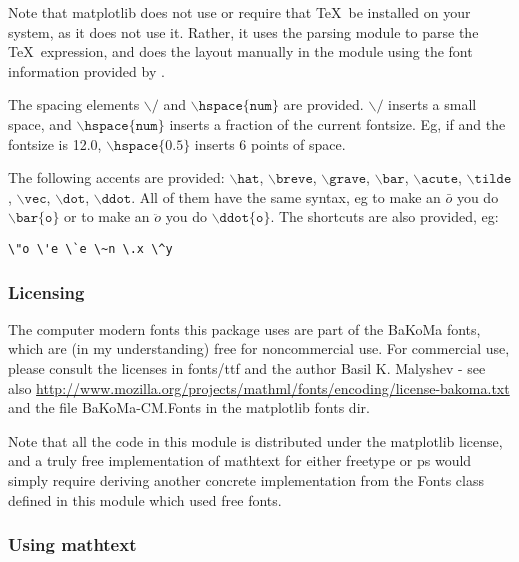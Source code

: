 \documentclass[twoside]{book}
\begin{document}
Note that matplotlib does not use or require that \TeX\ be installed on
your system, as it does not use it.  Rather, it uses the parsing
module  to parse the \TeX\ expression, and does the
layout manually in the  module using the
font information provided by .  

\noindent The spacing elements $\backslash/$ and $\mathtt{\backslash
  hspace\{num\}}$ are provided.  $\backslash /$ inserts a small space,
and $\mathtt{\backslash hspace\{num\}}$ inserts a fraction of the
current fontsize.  Eg, if  and the fontsize is 12.0,
$\mathtt{\backslash hspace\{0.5\}}$ inserts 6 points of space.

The following accents are provided: $\mathtt{\backslash hat}$,
$\mathtt{\backslash breve}$, $\mathtt{\backslash grave}$,
$\mathtt{\backslash bar}$, $\mathtt{\backslash acute}$,
$\mathtt{\backslash tilde}$, $\mathtt{\backslash vec}$,
$\mathtt{\backslash dot}$, $\mathtt{\backslash ddot}$.  All of them
have the same syntax, eg to make an $\bar{o}$ you do
$\mathtt{\backslash bar\{o\}}$ or to make an $\ddot{o}$ you do
$\mathtt{\backslash ddot\{o\}}$.  The shortcuts are also provided, eg:

\begin{verbatim}
\"o \'e \`e \~n \.x \^y
\end{verbatim}



\subsubsection{Licensing}
\label{sec:mathtext_license}

The computer modern fonts this package uses are part of the BaKoMa
fonts, which are (in my understanding) free for noncommercial use.
For commercial use, please consult the licenses in fonts/ttf and the
author Basil K. Malyshev - see also
\url{http://www.mozilla.org/projects/mathml/fonts/encoding/license-bakoma.txt}
and the file BaKoMa-CM.Fonts in the matplotlib fonts dir.

Note that all the code in this module is distributed under the
matplotlib license, and a truly free implementation of mathtext for
either freetype or ps would simply require deriving another concrete
implementation from the Fonts class defined in this module which used
free fonts.

\subsubsection{Using mathtext}
\end{document}
